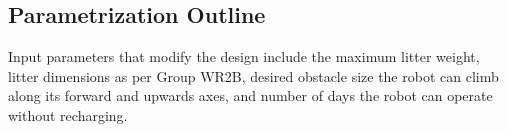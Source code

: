 \subsection{Parametrization Outline}

Input parameters that modify the design include the maximum litter weight, litter dimensions as per Group WR2B, desired obstacle size the robot can climb along its forward and upwards axes, and number of days the robot can operate without recharging.